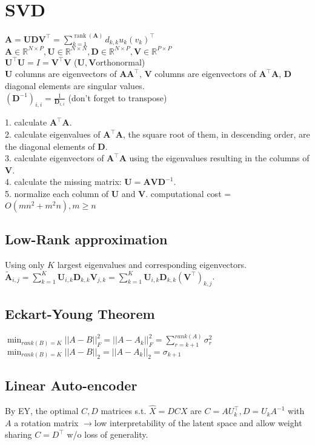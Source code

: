 \section{SVD}
$\mathbf{A} = \mathbf{U} \mathbf{D} \mathbf{V}^\top = \sum_{k=1}^{\operatorname{rank}(\mathbf{A})} d_{k,k} u_k (v_k)^\top$\\
$\mathbf{A} \in \mathbb{R}^{N \times P}, \mathbf{U} \in \mathbb{R}^{N \times N}, \mathbf{D} \in \mathbb{R}^{N \times P}, \mathbf{V} \in \mathbb{R}^{P \times P}$\\
$\mathbf{U}^\top \mathbf{U} = I = \mathbf{V}^\top \mathbf{V}$ ($\mathbf{U}, \mathbf{V}$orthonormal)\\
$\mathbf{U}$ columns are eigenvectors of $\mathbf{A} \mathbf{A}^\top$, $\mathbf{V}$ columns are eigenvectors of $\mathbf{A}^\top \mathbf{A}$, $\mathbf{D}$ diagonal elements are singular values.\\
$(\mathbf{D}^{-1})_{i,i} = \frac{1}{\mathbf{D}_{i, i}}$ (don't forget to transpose)

1. calculate $\mathbf{A}^\top \mathbf{A}$.\\
2. calculate eigenvalues of $\mathbf{A}^\top \mathbf{A}$, the square root of them, in descending order, are the diagonal elements of $\mathbf{D}$.\\
3. calculate eigenvectors of $\mathbf{A}^\top \mathbf{A}$ using the eigenvalues resulting in the columns of $\mathbf{V}$.\\
4. calculate the missing matrix: $\mathbf{U} = \mathbf{A} \mathbf{V} \mathbf{D}^{-1}$.\\
5. normalize each column of $\mathbf{U}$ and $\mathbf{V}$.
computational cost = $O(mn^2 + m^2n), m\geq n$
\subsection*{Low-Rank approximation}
Using only $K$ largest eigenvalues and corresponding eigenvectors. $\tilde{\mathbf{A}}_{i, j} = \sum_{k=1}^K \mathbf{U}_{i, k} \mathbf{D}_{k,k} \mathbf{V}_{j, k} = \sum_{k=1}^K \mathbf{U}_{i, k} \mathbf{D}_{k,k} (\mathbf{V}^\top)_{k, j}$.

\subsection*{Eckart-Young Theorem}
$\min_{rank(B)=K} ||A-B||_F^2 = ||A-A_k||_F^2 = \sum_{r=k+1}^{rank(A)} \sigma_r^2$
$\min_{rank(B)=K} ||A-B||_2 = ||A-A_k||_2 = \sigma_{k+1}$

\subsection*{Linear Auto-encoder}
By EY, the optimal $C,D$ matrices s.t. $\hat X = DCX$ are $C=AU_k^\top, D=U_kA^{-1}$ with $A$ a rotation matrix $\rightarrow$low interpretability of the latent space and allow weight sharing $C=D^\top$ w/o loss of generality.

